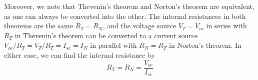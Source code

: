 \documentclass{article}
\begin{document}
\begin{itemize}
  Moreover, we note that Thevenin's theorem and Norton's theorem are 
  equivalent, as one can always be converted into the other. The internal 
  resistances in both theorems are the same $R_T=R_N$, and the voltage 
  source $V_T=V_{oc}$ in series with $R_T$ in Thevenin's theorem can be 
  converted to a current source $V_{oc}/R_T=V_T/R_T=I_{sc}=I_N$ in parallel 
  with $R_N=R_T$ in Norton's theorem. In either case, we can find the 
  internal resistance by
  \begin{equation}
    R_T=R_N=\frac{V_{oc}}{I_{sc}}
  \end{equation}

\begin{comment}

{\bf Load Line and Output Resistance}

Due to Thevenin's and Norton's theorems, any one-port network of 
resistors and energy sources can be converted into a simple voltage or 
current source with an internal or output resistance $R_0$. Moreover, 
the relationship between the voltage $V$ across and the current $I$ 
through the load is a straight line referred to as the {\bf load line}.
The absolute value of the slope $|\triangle V/\triangle I|=R_0$ of the
load line is the internal or output resistance of the network, as shown
in the figure below. On the other hand, the resistance $R_L$, which 
can be considered as the input resistance of the load, can also be 
represented on the graph as a straight line with its slope 
$\triangle V/\triangle I=R_L$. The intersection of these two straight
lines indicates the actual voltage $V$ and current $I$ with the load 
$R_L$.

\htmladdimg{../figures/loadline.gif}

The output resistance $R_0$ of a network can also be determined 
experimentally by varying the load $R_L$. Assume $(V_1, I_1)$ are 
associated with load $R_1$ and $(V_2, I_2)$ with load $R_2$, then 
the output resistance of the source network can be found to be:

\begin{equation} 
  R_0=-\frac{\triangle V}{\triangle I}=-\frac{V_1-V_2}{I_1-I_2} 
\end{equation}

To show this, we assume the source network is converted to a voltage
source with $V_0$ and $R_0$, and use two different loads $R_1$ and
$R_2$ with
\begin{equation} 
  I_1=\frac{V_0}{R_0+R_1},\;\;\;\;V_1=V_0\;\frac{R_1}{R_0+R_1},\;\;\;\;
  I_2=\frac{V_0}{R_0+R_2},\;\;\;\;V_2=V_0\;\frac{R_2}{R_0+R_2} 
\end{equation}
and
\begin{equation} 
  \triangle I=I_1-I_2=V_0\;\left(\frac{1}{R_0+R_1}-\frac{1}{R_0+R_2}\right),
  \;\;\; 
  \triangle V=V_1-V_2=V_0\;\left(\frac{R_1}{R_0+R_1}-\frac{R_2}{R_0+R_2}\right)
\end{equation}
The output resistance can therefore be found to be $R_0$ as expected:
\begin{equation} 
  -\frac{\triangle V}{\triangle I}=-\frac{V_1-V_2}{I_1-I_2}=R_0 
\end{equation}


\end{comment}
\end{itemize}
\end{document}
